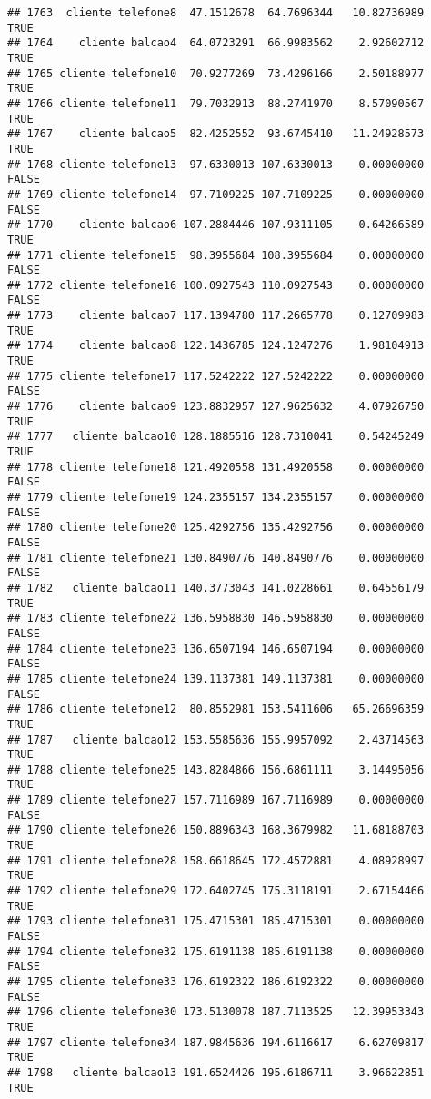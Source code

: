\documentclass[
]{article}
\begin{document}
\begin{verbatim}
## 1763  cliente telefone8  47.1512678  64.7696344   10.82736989     TRUE
## 1764    cliente balcao4  64.0723291  66.9983562    2.92602712     TRUE
## 1765 cliente telefone10  70.9277269  73.4296166    2.50188977     TRUE
## 1766 cliente telefone11  79.7032913  88.2741970    8.57090567     TRUE
## 1767    cliente balcao5  82.4252552  93.6745410   11.24928573     TRUE
## 1768 cliente telefone13  97.6330013 107.6330013    0.00000000    FALSE
## 1769 cliente telefone14  97.7109225 107.7109225    0.00000000    FALSE
## 1770    cliente balcao6 107.2884446 107.9311105    0.64266589     TRUE
## 1771 cliente telefone15  98.3955684 108.3955684    0.00000000    FALSE
## 1772 cliente telefone16 100.0927543 110.0927543    0.00000000    FALSE
## 1773    cliente balcao7 117.1394780 117.2665778    0.12709983     TRUE
## 1774    cliente balcao8 122.1436785 124.1247276    1.98104913     TRUE
## 1775 cliente telefone17 117.5242222 127.5242222    0.00000000    FALSE
## 1776    cliente balcao9 123.8832957 127.9625632    4.07926750     TRUE
## 1777   cliente balcao10 128.1885516 128.7310041    0.54245249     TRUE
## 1778 cliente telefone18 121.4920558 131.4920558    0.00000000    FALSE
## 1779 cliente telefone19 124.2355157 134.2355157    0.00000000    FALSE
## 1780 cliente telefone20 125.4292756 135.4292756    0.00000000    FALSE
## 1781 cliente telefone21 130.8490776 140.8490776    0.00000000    FALSE
## 1782   cliente balcao11 140.3773043 141.0228661    0.64556179     TRUE
## 1783 cliente telefone22 136.5958830 146.5958830    0.00000000    FALSE
## 1784 cliente telefone23 136.6507194 146.6507194    0.00000000    FALSE
## 1785 cliente telefone24 139.1137381 149.1137381    0.00000000    FALSE
## 1786 cliente telefone12  80.8552981 153.5411606   65.26696359     TRUE
## 1787   cliente balcao12 153.5585636 155.9957092    2.43714563     TRUE
## 1788 cliente telefone25 143.8284866 156.6861111    3.14495056     TRUE
## 1789 cliente telefone27 157.7116989 167.7116989    0.00000000    FALSE
## 1790 cliente telefone26 150.8896343 168.3679982   11.68188703     TRUE
## 1791 cliente telefone28 158.6618645 172.4572881    4.08928997     TRUE
## 1792 cliente telefone29 172.6402745 175.3118191    2.67154466     TRUE
## 1793 cliente telefone31 175.4715301 185.4715301    0.00000000    FALSE
## 1794 cliente telefone32 175.6191138 185.6191138    0.00000000    FALSE
## 1795 cliente telefone33 176.6192322 186.6192322    0.00000000    FALSE
## 1796 cliente telefone30 173.5130078 187.7113525   12.39953343     TRUE
## 1797 cliente telefone34 187.9845636 194.6116617    6.62709817     TRUE
## 1798   cliente balcao13 191.6524426 195.6186711    3.96622851     TRUE

\end{verbatim}
\end{document}
